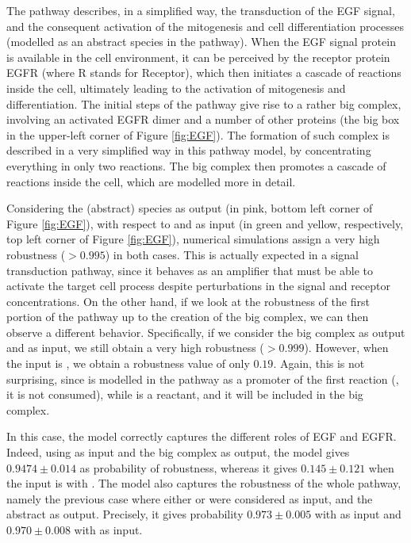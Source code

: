 The pathway describes, in a simplified way, the transduction of the EGF signal, and the consequent activation of the mitogenesis and cell differentiation processes (modelled as an abstract species in the pathway). When the EGF signal protein is available in the cell environment, it can be perceived by the receptor protein EGFR (where R stands for Receptor), which then initiates a cascade of reactions inside the cell, ultimately leading to the activation of mitogenesis and differentiation. The initial steps of the pathway give rise to a rather big complex, involving an activated EGFR dimer and a number of other proteins (the big box in the upper-left corner of Figure \ref{fig:EGF}). The formation of such complex is described in a very simplified way in this pathway model, by concentrating everything in only two reactions. The big complex then promotes a cascade of reactions inside the cell, which are modelled more in detail.

Considering the   (abstract) species as output (in pink, bottom left corner of Figure \ref{fig:EGF}), with respect to  and  as input (in green and yellow, respectively, top left corner of Figure \ref{fig:EGF}), numerical simulations assign a very high robustness ($>0.995$) in both cases. This is actually expected in a signal transduction pathway, since it behaves as an amplifier that must be able to activate the target cell process despite perturbations in the signal and receptor concentrations. On the other hand, if we look at the robustness of the first portion of the pathway up to the creation of the big complex, we can then observe a different behavior. Specifically, if we consider the big complex as output and  as input, we still obtain a very high robustness ($>0.999$). However, when the input is , we obtain a robustness value of only $0.19$. Again, this is not surprising, since  is modelled in the pathway as a promoter of the first reaction (\ie, it is not consumed), while  is a reactant, and it will be included in the big complex.

In this case, the model correctly captures the different roles of EGF and EGFR. Indeed, using  as input and the big complex as output, the model gives $0.9474 \pm 0.014$ as probability of robustness, whereas it gives $0.145 \pm 0.121$ when the input is with . The model also captures the robustness of the whole pathway, namely the previous case where either  or  were considered as input, and the abstract   as output. Precisely, it gives probability $0.973 \pm 0.005$ with  as input and $0.970 \pm 0.008$ with  as input.
